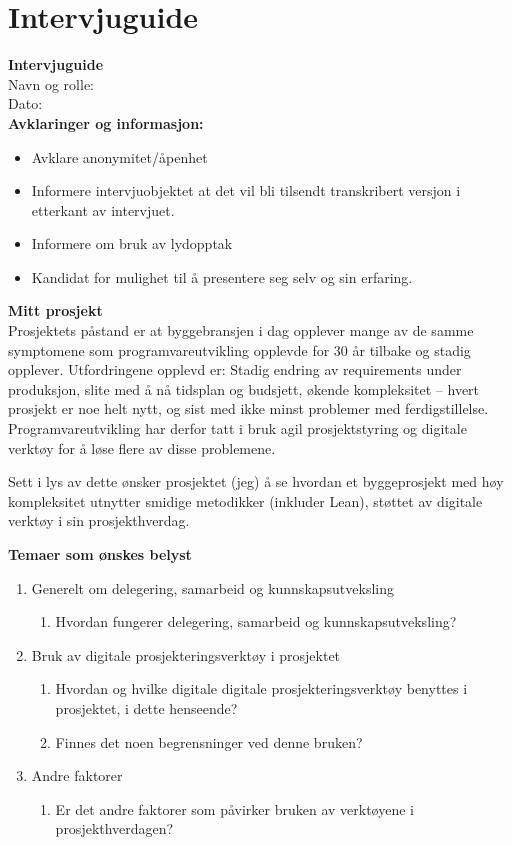 \chapter{Intervjuguide} \label{apx:interview_guide}
\noindent\textbf{Intervjuguide} \\
Navn og rolle: \\
Dato: \\

\noindent\textbf{Avklaringer og informasjon:} 
\begin{itemize}
    \item Avklare anonymitet/åpenhet
    \item Informere intervjuobjektet at det vil bli tilsendt transkribert versjon i etterkant av intervjuet.
    \item Informere om bruk av lydopptak
    \item Kandidat for mulighet til å presentere seg selv og sin erfaring.
\end{itemize}

\noindent\textbf{Mitt prosjekt} \\
Prosjektets påstand er at byggebransjen i dag opplever mange av de samme symptomene som programvareutvikling opplevde for 30 år tilbake og stadig opplever. Utfordringene opplevd er: Stadig endring av requirements under produksjon, slite med å nå tidsplan og budsjett, økende kompleksitet – hvert prosjekt er noe helt nytt, og sist med ikke minst problemer med ferdigstillelse. Programvareutvikling har derfor tatt i bruk agil prosjektstyring og digitale verktøy for å løse flere av disse problemene.

Sett i lys av dette ønsker prosjektet (jeg) å se hvordan et byggeprosjekt med høy kompleksitet utnytter smidige metodikker (inkluder Lean), støttet av digitale verktøy i sin prosjekthverdag. \\

\pagebreak

\noindent\textbf{Temaer som ønskes belyst}
\begin{enumerate}
    \item Generelt om delegering, samarbeid og kunnskapsutveksling
    \begin{enumerate}
        \item Hvordan fungerer delegering, samarbeid og kunnskapsutveksling?
    \end{enumerate}
    \item Bruk av digitale prosjekteringsverktøy i prosjektet
    \begin{enumerate}
        \item Hvordan og hvilke digitale digitale prosjekteringsverktøy benyttes i\\ prosjektet, i dette henseende?
        \item Finnes det noen begrensninger ved denne bruken?
    \end{enumerate}
    \item Andre faktorer
    \begin{enumerate}
        \item Er det andre faktorer som påvirker bruken av verktøyene i prosjekthverdagen?
    \end{enumerate}
\end{enumerate}